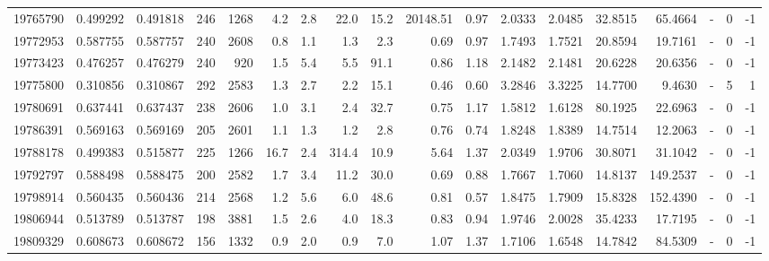 \begin{tabular}{rrrrrrrrrrrrrrrlrr}
  19765790 & 0.499292 &   0.491818 &  246 & 1268 &      4.2 &      2.8 &    22.0 &     15.2 &   20148.51 &        0.97 &  2.0333 &  2.0485 &   32.8515 &   65.4664 &             - &        0 &         -1 \\
  19772953 & 0.587755 &   0.587757 &  240 & 2608 &      0.8 &      1.1 &     1.3 &      2.3 &       0.69 &        0.97 &  1.7493 &  1.7521 &   20.8594 &   19.7161 &             - &        0 &         -1 \\
  19773423 & 0.476257 &   0.476279 &  240 &  920 &      1.5 &      5.4 &     5.5 &     91.1 &       0.86 &        1.18 &  2.1482 &  2.1481 &   20.6228 &   20.6356 &             - &        0 &         -1 \\
  19775800 & 0.310856 &   0.310867 &  292 & 2583 &      1.3 &      2.7 &     2.2 &     15.1 &       0.46 &        0.60 &  3.2846 &  3.3225 &   14.7700 &    9.4630 &             - &        5 &          1 \\
  19780691 & 0.637441 &   0.637437 &  238 & 2606 &      1.0 &      3.1 &     2.4 &     32.7 &       0.75 &        1.17 &  1.5812 &  1.6128 &   80.1925 &   22.6963 &             - &        0 &         -1 \\
  19786391 & 0.569163 &   0.569169 &  205 & 2601 &      1.1 &      1.3 &     1.2 &      2.8 &       0.76 &        0.74 &  1.8248 &  1.8389 &   14.7514 &   12.2063 &             - &        0 &         -1 \\
  19788178 & 0.499383 &   0.515877 &  225 & 1266 &     16.7 &      2.4 &   314.4 &     10.9 &       5.64 &        1.37 &  2.0349 &  1.9706 &   30.8071 &   31.1042 &             - &        0 &         -1 \\
  19792797 & 0.588498 &   0.588475 &  200 & 2582 &      1.7 &      3.4 &    11.2 &     30.0 &       0.69 &        0.88 &  1.7667 &  1.7060 &   14.8137 &  149.2537 &             - &        0 &         -1 \\
  19798914 & 0.560435 &   0.560436 &  214 & 2568 &      1.2 &      5.6 &     6.0 &     48.6 &       0.81 &        0.57 &  1.8475 &  1.7909 &   15.8328 &  152.4390 &             - &        0 &         -1 \\
  19806944 & 0.513789 &   0.513787 &  198 & 3881 &      1.5 &      2.6 &     4.0 &     18.3 &       0.83 &        0.94 &  1.9746 &  2.0028 &   35.4233 &   17.7195 &             - &        0 &         -1 \\
  19809329 & 0.608673 &   0.608672 &  156 & 1332 &      0.9 &      2.0 &     0.9 &      7.0 &       1.07 &        1.37 &  1.7106 &  1.6548 &   14.7842 &   84.5309 &             - &        0 &         -1 \\

\end{tabular}
